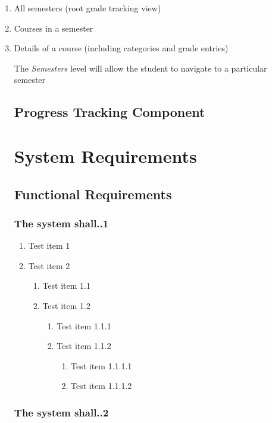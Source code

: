 \documentclass[12pt]{article}
\newenvironment{requirement}[1]
{
    \renewcommand{\thesubsubsection}{R\arabic{subsubsection}.}
    \renewcommand{\labelenumi}{
        \arabic{subsubsection}.\arabic{enumi}
    }
    \renewcommand{\labelenumii}{
        \arabic{subsubsection}.\arabic{enumi}.\arabic{enumii}
    }
    \renewcommand{\labelenumiii}{
        \arabic{subsubsection}.\arabic{enumi}.\arabic{enumii}.\arabic{enumiii}
    }
    \renewcommand{\labelenumiv}{
        \arabic{subsubsection}.\arabic{enumi}.\arabic{enumii}.\arabic{enumiii}.\arabic{enumiv}
    }
    \subsubsection{#1}
}
{}
\begin{document}
\begin{enumerate}
    \item All semesters (root grade tracking view)
    \item Courses in a semester
    \item Details of a course (including categories and grade entries)
\begin{enumerate}

The \textit{Semesters} level will allow the student to navigate to a particular semester

\subsection{Progress Tracking Component}

\section{System Requirements}
\subsection{Functional Requirements}
\begin{requirement}{The system shall..1}


\begin{enumerate}
    \item Test item 1
    \item Test item 2
    \begin{enumerate}
        \item Test item 1.1
        \item Test item 1.2
        \begin{enumerate}
            \item Test item 1.1.1
            \item Test item 1.1.2
            \begin{enumerate}
                \item Test item 1.1.1.1
                \item Test item 1.1.1.2
            \end{enumerate}
        \end{enumerate}
    \end{enumerate}
\end{enumerate}


\end{requirement}

\begin{requirement}{The system shall..2}



\end{requirement}
\end{enumerate}
\end{enumerate}
\end{document}

